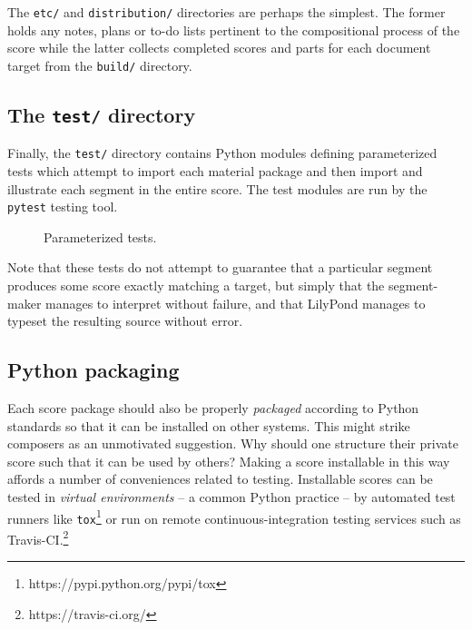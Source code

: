 The \texttt{etc/} and \texttt{distribution/} directories are perhaps the
simplest. The former holds any notes, plans or to-do lists pertinent to the
compositional process of the score while the latter collects completed scores
and parts for each document target from the \texttt{build/} directory.

\subsection{The \texttt{test/} directory}
\label{ssec:the-test-directory}

Finally, the \texttt{test/} directory contains Python modules defining
parameterized tests which attempt to import each material package and then
import and illustrate each segment in the entire score. The test modules are
run by the \texttt{pytest} testing tool.

\begin{figure}[h!]
\begin{singlespacing}
\vspace{-0.5\baselineskip}
\end{singlespacing}
\caption{Parameterized tests.}
\end{figure}

Note that these tests do not attempt to guarantee that a particular segment
produces some score exactly matching a target, but simply that the
segment-maker manages to interpret without failure, and that LilyPond manages
to typeset the resulting source without error.

\subsection{Python packaging}
\label{ssec:python-packaging}

Each score package should also be properly \emph{packaged} according to Python
standards so that it can be installed on other systems. This might strike
composers as an unmotivated suggestion. Why should one structure their private
score such that it can be used by others? Making a score installable in this
way affords a number of conveniences related to testing. Installable scores can
be tested in \emph{virtual environments} -- a common Python practice -- by
automated test runners like
\texttt{tox}\footnote{https://pypi.python.org/pypi/tox} or run on remote
continuous-integration testing services such as
Travis-CI.\footnote{https://travis-ci.org/}


